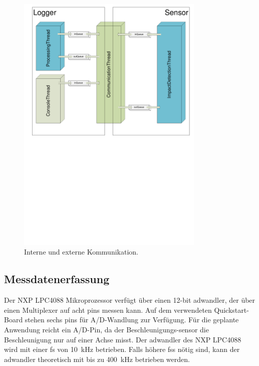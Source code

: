 \begin{figure}
	\centering
		\includegraphics[width=0.8\textwidth]{images/visio/IPC-Grob.pdf}
	\caption{Interne und externe Kommunikation.}
	\label{fig.ipccomm}
\end{figure}


\subsection{Messdatenerfassung}\label{subsec.sw_messen}
Der NXP LPC4088 Mikroprozessor verfügt über einen 12-bit \gls{adwandler}, der über einen Multiplexer auf acht \glspl{pin} messen kann. Auf dem verwendeten Quickstart-Board stehen sechs \glspl{pin} für A/D-Wandlung zur Verfügung. Für die geplante Anwendung reicht ein A/D-Pin, da der Beschleunigungs-\gls{sensor} die Beschleunigung nur auf einer Achse misst. Der \gls{adwandler} des NXP LPC4088 wird mit einer \gls{fs} von 10~kHz betrieben. Falls höhere \glspl{fs} nötig sind, kann der \gls{adwandler} theoretisch mit bis zu 400~kHz betrieben werden.

